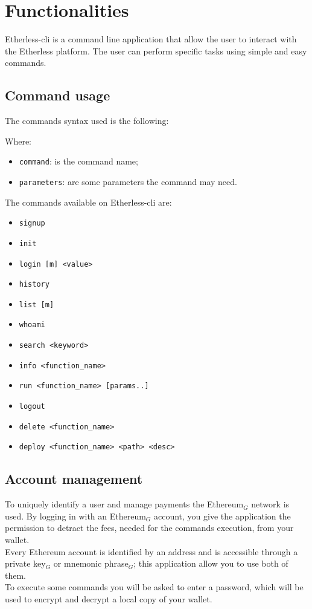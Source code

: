 \section{Functionalities}
Etherless-cli is a command line application that allow the user to interact with the Etherless platform. The user can perform specific tasks using simple and easy commands.

\subsection{Command usage}
The commands syntax used is the following:
\begin{center}
\end{center}
Where:
\begin{itemize}
	\item \texttt{command}: is the command name;
	\item \texttt{parameters}: are some parameters the command may need.
\end{itemize}

\noindent The commands available on Etherless-cli are:
\begin{itemize}
	\item \texttt{signup}
	\item \texttt{init}
	\item \texttt{login [m] <value>}
	\item \texttt{history}
	\item \texttt{list [m]}
	\item \texttt{whoami}
	\item \texttt{search <keyword>}
	\item \texttt{info <function\_name>}
	\item \texttt{run <function\_name> [params..]}
	\item \texttt{logout}
	\item \texttt{delete <function\_name>}
	\item \texttt{deploy <function\_name> <path> <desc>}
\end{itemize}

\subsection{Account management}
To uniquely identify a user and manage payments the Ethereum$_{G}$ network is used. By logging in with an Ethereum$_{G}$ account, you give the application the permission to detract the fees, needed for the commands execution, from your wallet. \\
Every Ethereum account is identified by an address and is accessible through a private key$_{G}$ or mnemonic phrase$_{G}$; this application allow you to use both of them. \\
To execute some commands you will be asked to enter a password, which will be used to encrypt and decrypt a local copy of your wallet.

